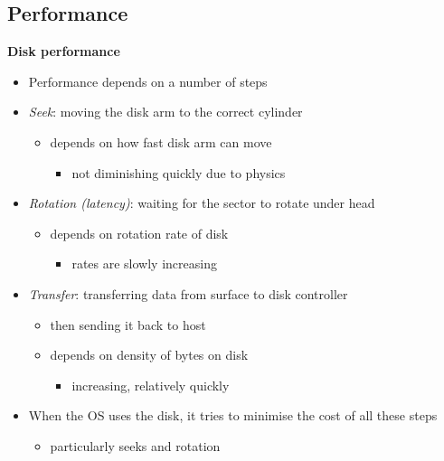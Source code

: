 \documentclass[11pt,a4paper]{article}
\begin{document}
\subsection{Performance}

\textbf{Disk performance}
\begin{itemize}
    \item Performance depends on a number of steps
    \item \emph{Seek}: moving the disk arm to the correct cylinder
        \begin{itemize}
            \item depends on how fast disk arm can move
                \begin{itemize}
                    \item not diminishing quickly due to physics
                \end{itemize}
        \end{itemize}
    \item \emph{Rotation (latency)}: waiting for the sector to rotate under head
        \begin{itemize}
            \item depends on rotation rate of disk
                \begin{itemize}
                    \item rates are slowly increasing
                \end{itemize}
        \end{itemize}
    \item \emph{Transfer}: transferring data from surface to disk controller
        \begin{itemize}
            \item  then sending it back to host
            \item depends on density of bytes on disk
                \begin{itemize}
                    \item increasing, relatively quickly
                \end{itemize}
        \end{itemize}
    \item When the OS uses the disk, it tries to minimise the cost of all these steps
        \begin{itemize}
            \item particularly seeks and rotation
        \end{itemize}
\end{itemize}
\end{document}
